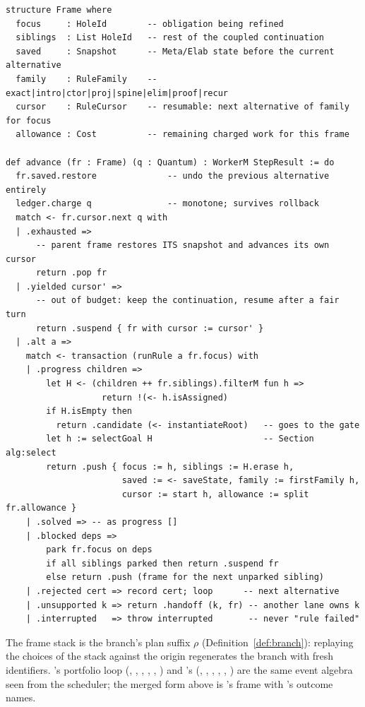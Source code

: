 \begin{lstlisting}
structure Frame where
  focus     : HoleId        -- obligation being refined
  siblings  : List HoleId   -- rest of the coupled continuation
  saved     : Snapshot      -- Meta/Elab state before the current alternative
  family    : RuleFamily    -- exact|intro|ctor|proj|spine|elim|proof|recur
  cursor    : RuleCursor    -- resumable: next alternative of family for focus
  allowance : Cost          -- remaining charged work for this frame

def advance (fr : Frame) (q : Quantum) : WorkerM StepResult := do
  fr.saved.restore              -- undo the previous alternative entirely
  ledger.charge q               -- monotone; survives rollback
  match <- fr.cursor.next q with
  | .exhausted =>
      -- parent frame restores ITS snapshot and advances its own cursor
      return .pop fr
  | .yielded cursor' =>
      -- out of budget: keep the continuation, resume after a fair turn
      return .suspend { fr with cursor := cursor' }
  | .alt a =>
    match <- transaction (runRule a fr.focus) with
    | .progress children =>
        let H <- (children ++ fr.siblings).filterM fun h =>
                   return !(<- h.isAssigned)
        if H.isEmpty then
          return .candidate (<- instantiateRoot)   -- goes to the gate
        let h := selectGoal H                      -- Section alg:select
        return .push { focus := h, siblings := H.erase h,
                       saved := <- saveState, family := firstFamily h,
                       cursor := start h, allowance := split fr.allowance }
    | .solved => -- as progress []
    | .blocked deps =>
        park fr.focus on deps
        if all siblings parked then return .suspend fr
        else return .push (frame for the next unparked sibling)
    | .rejected cert => record cert; loop      -- next alternative
    | .unsupported k => return .handoff (k, fr) -- another lane owns k
    | .interrupted   => throw interrupted       -- never "rule failed"
\end{lstlisting}

The frame stack is the branch's plan suffix $\rho$ (Definition~\ref{def:branch}): replaying the  choices of the stack against the origin regenerates the branch with fresh identifiers. 's portfolio loop (, , , , , ) and 's (, , , , , ) are the same event algebra seen from the scheduler; the merged form above is 's frame with 's outcome names.

